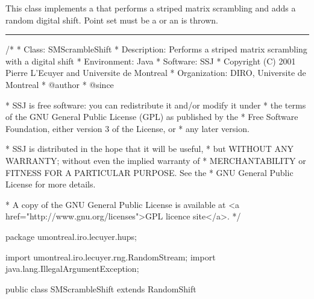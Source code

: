 
This class implements a
that performs a striped matrix scrambling and adds a random
digital shift. Point set must be a
 or an
 is thrown.

\bigskip\hrule\bigskip

\begin{code}
\begin{hide}
/*
 * Class:        SMScrambleShift
 * Description:  Performs a striped matrix scrambling with a digital shift
 * Environment:  Java
 * Software:     SSJ 
 * Copyright (C) 2001  Pierre L'Ecuyer and Universite de Montreal
 * Organization: DIRO, Universite de Montreal
 * @author       
 * @since

 * SSJ is free software: you can redistribute it and/or modify it under
 * the terms of the GNU General Public License (GPL) as published by the
 * Free Software Foundation, either version 3 of the License, or
 * any later version.

 * SSJ is distributed in the hope that it will be useful,
 * but WITHOUT ANY WARRANTY; without even the implied warranty of
 * MERCHANTABILITY or FITNESS FOR A PARTICULAR PURPOSE.  See the
 * GNU General Public License for more details.

 * A copy of the GNU General Public License is available at
   <a href="http://www.gnu.org/licenses">GPL licence site</a>.
 */
\end{hide}
package umontreal.iro.lecuyer.hups;
\begin{hide}
 import umontreal.iro.lecuyer.rng.RandomStream;
 import java.lang.IllegalArgumentException;
\end{hide}

public class SMScrambleShift extends RandomShift \begin{hide} {
\end{hide}
\end{code}

